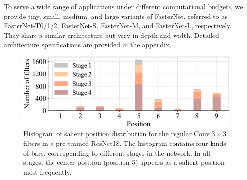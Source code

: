 To serve a wide range of applications under different computational budgets, we provide tiny, small, medium, and large variants of FasterNet, referred to as FasterNet-T0/1/2, FasterNet-S, FasterNet-M, and FasterNet-L, respectively. They share a similar architecture but vary in depth and width. Detailed architecture specifications are provided in the appendix.

\begin{figure}
    \vspace{-0.15in}
    \centering
    \includegraphics[width=.99\linewidth]{figures/positionwise_norm_filter-cropped.pdf}
    \vspace{-0.1in}
    \caption{Histogram of salient position distribution for the regular Conv 
    $3 \times 3$
    filters in a pre-trained ResNet18. The histogram contains four kinds of bars, corresponding to different stages in the network. In all stages, the center position (position 5) appears as a salient position most frequently.}
    \label{fig: positionwise_norm}
    \vspace{-0.1in}
\end{figure}
